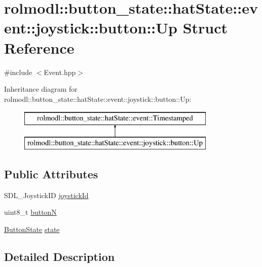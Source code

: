 \hypertarget{structrolmodl_1_1button__state_1_1hat_state_1_1event_1_1joystick_1_1button_1_1_up}{}\section{rolmodl\+::button\+\_\+state\+::hat\+State\+::event\+::joystick\+::button\+::Up Struct Reference}
\label{structrolmodl_1_1button__state_1_1hat_state_1_1event_1_1joystick_1_1button_1_1_up}


{\ttfamily \#include $<$Event.\+hpp$>$}

Inheritance diagram for rolmodl\+::button\+\_\+state\+::hat\+State\+::event\+::joystick\+::button\+::Up\+:\begin{figure}[H]
\begin{center}
\leavevmode
\includegraphics[height=2.000000cm]{structrolmodl_1_1button__state_1_1hat_state_1_1event_1_1joystick_1_1button_1_1_up}
\end{center}
\end{figure}
\subsection*{Public Attributes}
\begin{DoxyCompactItemize}
\item 
S\+D\+L\+\_\+\+Joystick\+ID \mbox{\hyperlink{structrolmodl_1_1button__state_1_1hat_state_1_1event_1_1joystick_1_1button_1_1_up_aa315b2603857797366b414ae9ebcf419}{joystick\+Id}}
\item 
uint8\+\_\+t \mbox{\hyperlink{structrolmodl_1_1button__state_1_1hat_state_1_1event_1_1joystick_1_1button_1_1_up_a2252cb08078af446ddb01724b44352dd}{buttonN}}
\item 
\mbox{\hyperlink{namespacerolmodl_ad08ec5c56aa1db118f871357b2d475fd}{Button\+State}} \mbox{\hyperlink{structrolmodl_1_1button__state_1_1hat_state_1_1event_1_1joystick_1_1button_1_1_up_ad22245290652030fe1092863e8723c35}{state}}
\end{DoxyCompactItemize}


\subsection{Detailed Description}


